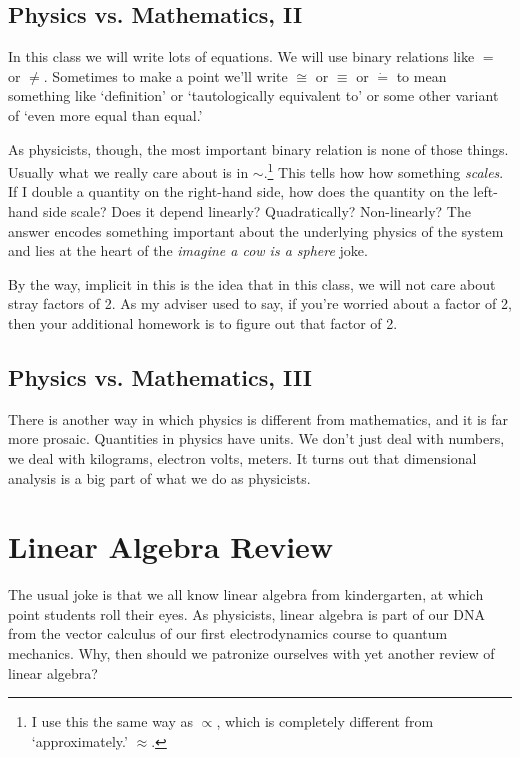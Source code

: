 \documentclass[12pt]{article}
\numberwithin{equation}{section}    %
\begin{document}
\subsection{Physics vs. Mathematics, II}

In this class we will write lots of equations. We will use binary relations like $=$ or $\neq$. Sometimes to make a point we’ll write $\cong$ or $\equiv$ or $\dot =$ to mean something like `definition’ or `tautologically equivalent to’ or some other variant of `even more equal than equal.’ 

As physicists, though, the most important binary relation is none of those things. Usually what we really care about is in $\sim$.\footnote{I use this the same way as $\propto$, which is completely different from `approximately.’ $\approx$.} This tells how how something \emph{scales}. If I double a quantity on the right-hand side, how does the quantity on the left-hand side scale? Does it depend linearly? Quadratically? Non-linearly? The answer encodes something important about the underlying physics of the system and lies at the heart of the \emph{imagine a cow is a sphere} joke. 


By the way, implicit in this is the idea that in this class, we will not care about stray factors of 2. As my adviser used to say, if you’re worried about a factor of 2, then your additional homework is to figure out that factor of 2. 

\subsection{Physics vs. Mathematics, III}

There is another way in which physics is different from mathematics, and it is far more prosaic. Quantities in physics have units. We don’t just deal with numbers, we deal with kilograms, electron volts, meters. It turns out that dimensional analysis is a big part of what we do as physicists. 









\section{Linear Algebra Review}

The usual joke is that we all know linear algebra from kindergarten, at which point students roll their eyes. As physicists, linear algebra is part of our DNA from the vector calculus of our first electrodynamics course to quantum mechanics. Why, then should we patronize ourselves with yet another review of linear algebra?
\end{document}

